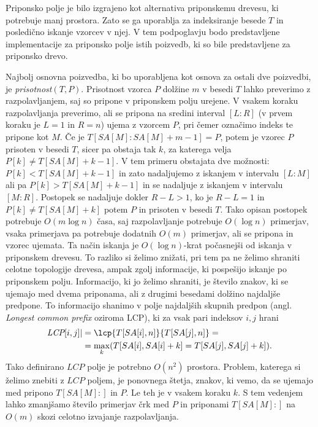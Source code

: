 Priponsko polje je bilo izgrajeno kot alternativa priponskemu drevesu, ki potrebuje manj prostora. Zato se ga uporablja za indeksiranje besede $T$ in posledično iskanje vzorcev v njej. V tem podpoglavju bodo predstavljene implementacije za priponsko polje istih poizvedb, ki so bile predstavljene za priponsko drevo.

Najbolj osnovna poizvedba, ki bo uporabljena kot osnova za ostali dve poizvedbi, je \textit{prisotnost}$(T,P)$. Prisotnost vzorca $P$ dolžine $m$ v besedi $T$ lahko preverimo z razpolavljanjem, saj so pripone v priponskem polju urejene. V vsakem koraku razpolavljanja preverimo, ali se pripona na sredini interval $[L:R]$ (v prvem koraku je $L=1$ in $R=n$) ujema z vzorcem $P$, pri čemer označimo indeks te pripone kot $M$. Če je $T[SA[M]:SA[M]+m-1]=P$, potem je vzorec $P$ prisoten v besedi $T$, sicer pa obstaja tak $k$, za katerega velja $P[k]\ne T[SA[M]+k-1]$. V tem primeru obstajata dve možnosti: $P[k]<T[SA[M]+k-1]$ in zato nadaljujemo z iskanjem v intervalu $[L:M]$ ali pa $P[k]>T[SA[M]+k-1]$ in se nadaljuje z iskanjem v intervalu $[M:R]$. Postopek se nadaljuje dokler $R-L>1$, ko je $R-L=1$ in $P[k]\ne T[SA[M]+k]$ potem $P$ in prisoten v besedi $T$. Tako opisan postopek potrebuje $O(m\log{n})$ časa, saj razpolavljanje potrebuje $O(\log{n})$ primerjav, vsaka primerjava pa potrebuje dodatnih $O(m)$ primerjav, ali se pripona in vzorec ujemata. Ta način iskanja je $O(\log{n})$-krat počasnejši od iskanja v priponskem drevesu. To razliko si želimo znižati, pri tem pa ne želimo shraniti celotne topologije drevesa, ampak zgolj informacije, ki pospešijo iskanje po priponskem polju. Informacijo, ki jo želimo shraniti, je število znakov, ki se ujemajo med dvema priponama, ali z drugimi besedami dolžino najdaljše predpone. To informacijo shanimo v polje najdaljših skupnih predpon (angl. \textit{Longest common prefix} oziroma LCP), ki za vsak pari indeksov $i,j$ hrani
    \begin{equation*} 
        \begin{split}
        \textit{LCP}[i,j]|&=\lcp{T[SA[i],n]}{T[SA[j],n]}=\\
         &=\max_{k}(T[SA[i],SA[i]+k]=T[SA[j],SA[j]+k]).\\
        \end{split}
    \end{equation*}
Tako definirano $LCP$ polje je potrebno $O(n^2)$ prostora. Problem, katerega si želimo znebiti z $LCP$ poljem, je ponovnega štetja, znakov, ki vemo, da se ujemajo med pripono $T[SA[M]:]$ in $P$. Le teh je v vsakem koraku $k$. S tem vedenjem lahko zmanjšamo število primerjav črk med $P$ in priponami $T[SA[M]:]$ na $O(m)$ skozi celotno izvajanje razpolavljanja. 

